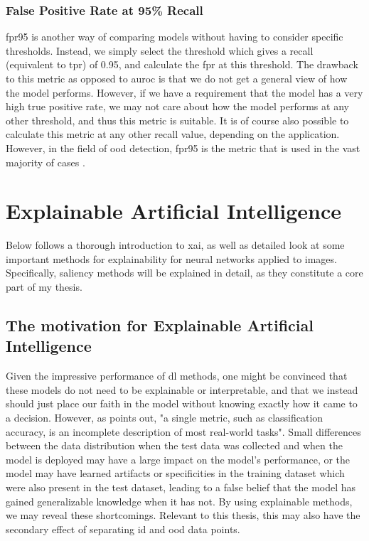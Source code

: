 \documentclass[UKenglish]{uiomasterthesis} %
\theoremstyle{definition}
\begin{document}
\subsubsection{False Positive Rate at 95\% Recall}

\ac{fpr95} is another way of comparing models without having to consider specific thresholds. Instead, we simply select the threshold which gives a recall (equivalent to \ac{tpr}) of 0.95, and calculate the \ac{fpr} at this threshold. The drawback to this metric as opposed to \ac{auroc} is that we do not get a general view of how the model performs. However, if we have a requirement that the model has a very high true positive rate, we may not care about how the model performs at any other threshold, and thus this metric is suitable. It is of course also possible to calculate this metric at any other recall value, depending on the application. However, in the field of \ac{ood} detection, \ac{fpr95} is the metric that is used in the vast majority of cases \cite{oodbaseline, odin, oodoverview, openood, vim}.


\section{Explainable Artificial Intelligence} \label{chapter:xai}

Below follows a thorough introduction to \ac{xai}, as well as detailed look at some important methods for explainability for neural networks applied to images. Specifically, saliency methods will be explained in detail, as they constitute a core part of my thesis.

\subsection{The motivation for Explainable Artificial Intelligence}

Given the impressive performance of \ac{dl} methods, one might be convinced that these models do not need to be explainable or interpretable, and that we instead should just place our faith in the model without knowing exactly how it came to a decision. However, as \cite{doshivelez} points out, "a single metric, such as classification accuracy, is an incomplete description of most real-world tasks". Small differences between the data distribution when the test data was collected and when the model is deployed may have a large impact on the model's performance, or the model may have learned artifacts or specificities in the training dataset which were also present in the test dataset, leading to a false belief that the model has gained generalizable knowledge when it has not. By using explainable methods, we may reveal these shortcomings. Relevant to this thesis, this may also have the secondary effect of separating \ac{id} and \ac{ood} data points.
\end{document}
